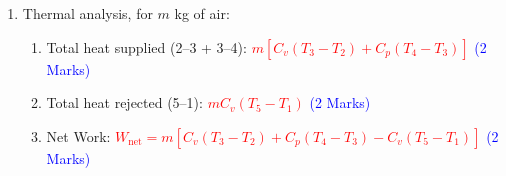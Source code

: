 \documentclass[12pt,twoside]{report}
\begin{document}
\begin{description}
\begin{enumerate}
\item Thermal analysis, for $m$ kg of air:
\begin{enumerate}%
\item Total heat supplied (2--3 + 3--4): \textcolor{red}{$m\left[C_{v}\left(T_{3}-T_{2}\right) + C_{p}\left(T_{4}-T_{3}\right)\right]$} \textcolor{blue}{(2 Marks)}
\item Total heat rejected (5--1): \textcolor{red}{$mC_{v}\left(T_{5}-T_{1}\right)$}  \textcolor{blue}{(2 Marks)}
\item Net Work: \textcolor{red}{$W_{\text{net}}= m\left[C_{v}\left(T_{3}-T_{2}\right) + C_{p}\left(T_{4}-T_{3}\right)-C_{v}\left(T_{5}-T_{1}\right)\right]$} \textcolor{blue}{(2 Marks)}
\end{enumerate}

\end{enumerate}

\end{description}

%
%
%
%
\end{document}
